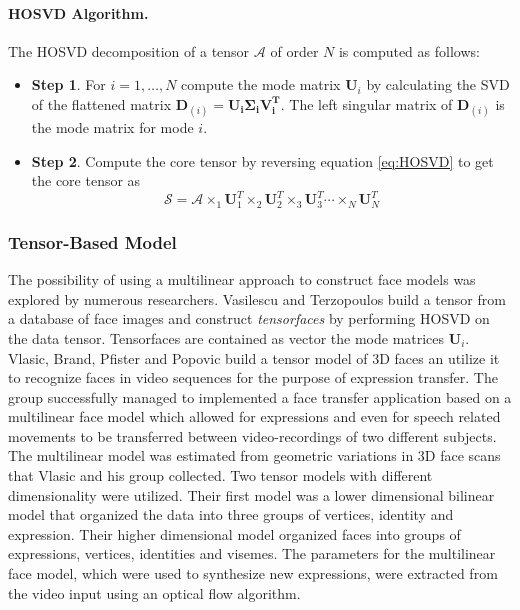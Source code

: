 \documentclass[11pt,a4paper]{report}
\begin{document}
\paragraph{HOSVD Algorithm.} The HOSVD decomposition of a tensor $\mathcal{A}$
of order $N$ is computed as follows:
\begin{itemize}
\item \textbf{Step 1}. For $i=1,\ldots,N$ compute the mode matrix $\mathbf{U}_i$
  by calculating the SVD of the flattened matrix $\mathbf{D}_{(i)} = \mathbf{U_i
    \Sigma_i V_i^T}$. The left singular matrix of $\mathbf{D}_{(i)}$ is the mode
  matrix for mode $i$.
\item  \textbf{Step 2}. Compute the core tensor by reversing equation
  \ref{eq:HOSVD} to get the core tensor as 
\begin{equation}\label{eq:core}
\mathcal{S} = \mathcal{A} \times_1 \mathbf{U}_1^T \times_2
\mathbf{U}_2^T \times_3 \mathbf{U}_3^T \dotsb \times_N \mathbf{U}_N^T
\end{equation}
\end{itemize}


\subsubsection{Tensor-Based Model}\label{works}
The possibility of using a multilinear approach to construct face models was explored
by numerous researchers. Vasilescu and Terzopoulos \cite{Ter1} build a tensor from a
database of face images and construct \textit{tensorfaces} by performing HOSVD
on the data tensor. Tensorfaces are contained as vector the mode matrices
$\mathbf{U}_i$. Vlasic, Brand, Pfister and Popovic \cite{faceTransfer05} build a
tensor model of 3D faces an utilize it to recognize faces in video sequences for
the purpose of expression transfer. The group
successfully managed to implemented a face transfer application based on a
multilinear face model which allowed for expressions and even for speech related
movements to be transferred between video-recordings of two different subjects. The multilinear
model was estimated from geometric variations in 3D face scans that Vlasic and
his group collected. Two tensor models with different dimensionality were utilized. Their first model was a lower dimensional bilinear model that organized the data into three
groups of vertices, identity and expression. Their higher dimensional model
organized faces into groups of expressions, vertices, identities and visemes. The parameters for the multilinear face model, which were used to synthesize new expressions, were
extracted from the video input using an optical flow algorithm.
\end{document}
